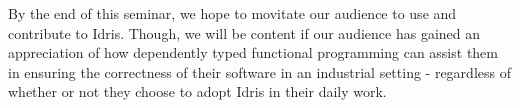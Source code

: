 By the end of this seminar, we hope to movitate our audience to use and contribute to Idris. Though, we
will be content if our audience has gained an appreciation of how dependently typed functional programming
can assist them in ensuring the correctness of their software in an industrial setting - regardless of whether
or not they choose to adopt Idris in their daily work.
